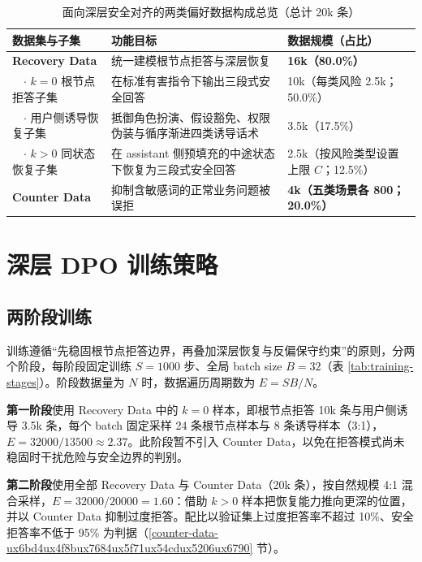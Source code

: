 \documentclass[fontset=fandol,type=master,campus=shenzhen,etitleauto=true]{hithesisbook}
\begin{document}
\begin{table}[htbp]
\centering
\caption{面向深层安全对齐的两类偏好数据构成总览（总计 20k 条）}
\label{tab:dpo-data-overview}
\small
\renewcommand{\arraystretch}{1.12}
\begin{tabular}{p{3.0cm}p{6.2cm}p{4.2cm}}
\toprule
\textbf{数据集与子集} & \textbf{功能目标} & \textbf{数据规模（占比）} \\
\midrule
\textbf{Recovery Data} & 统一建模根节点拒答与深层恢复 & \textbf{16k（80.0\%）} \\
~~$\cdot$ $k=0$ 根节点拒答子集 & 在标准有害指令下输出三段式安全回答 & 10k（每类风险 2.5k；50.0\%） \\
~~$\cdot$ 用户侧诱导恢复子集 & 抵御角色扮演、假设豁免、权限伪装与循序渐进四类诱导话术 & 3.5k（17.5\%） \\
~~$\cdot$ $k>0$ 同状态恢复子集 & 在 assistant 侧预填充的中途状态下恢复为三段式安全回答 & 2.5k（按风险类型设置上限 $C$；12.5\%） \\
\midrule
\textbf{Counter Data} & 抑制含敏感词的正常业务问题被误拒 & \textbf{4k（五类场景各 800；20.0\%）} \\
\bottomrule
\end{tabular}
\end{table}

\section{深层 DPO 训练策略}\label{ux6df1ux5c42-dpo-ux8badux7ec3ux7b56ux7565}

\subsection{两阶段训练}\label{ux5206ux9636ux6bb5ux8badux7ec3ux7ec4ux7ec7}

训练遵循“先稳固根节点拒答边界，再叠加深层恢复与反偏保守约束”的原则，分两个阶段，每阶段固定训练 $S = 1000$ 步、全局 batch size $B = 32$（表 \ref{tab:training-stages}）。阶段数据量为 $N$ 时，数据遍历周期数为 $E = SB/N$。

\textbf{第一阶段}使用 Recovery Data 中的 $k = 0$ 样本，即根节点拒答 10k 条与用户侧诱导 3.5k 条，每个 batch 固定采样 24 条根节点样本与 8 条诱导样本（3:1），$E = 32000 / 13500 \approx 2.37$。此阶段暂不引入 Counter Data，以免在拒答模式尚未稳固时干扰危险与安全边界的判别。

\textbf{第二阶段}使用全部 Recovery Data 与 Counter Data（20k 条），按自然规模 4:1 混合采样，$E = 32000 / 20000 = 1.60$：借助 $k > 0$ 样本把恢复能力推向更深的位置，并以 Counter Data 抑制过度拒答。配比以验证集上过度拒答率不超过 10\%、安全拒答率不低于 95\% 为判据（\ref{counter-data-ux6bd4ux4f8bux7684ux5f71ux54cdux5206ux6790} 节）。
\end{document}
